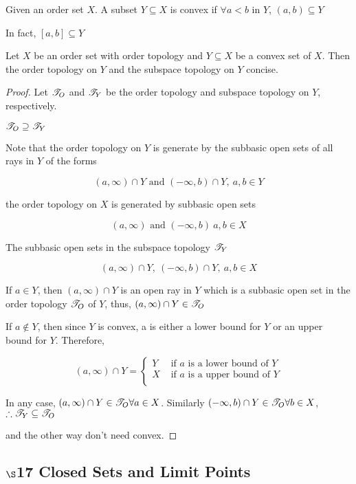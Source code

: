 \begin{defn}
	Given an order set $X$. A subset $Y \subseteq X$ is convex if $\forall a < b$ in $Y$, $(a,b) \subseteq Y$
	
	In fact, $[a,b] \subseteq Y$
\end{defn}

\begin{thm*}
	Let $X$ be an order set with order topology and $Y \subseteq X$ be a convex set of $X$. Then the order topology on $Y$ and the subspace topology on $Y$ concise.
\end{thm*}

\begin{proof}
	Let $\mathscr{T}_O$ and $\mathscr{T}_Y$ be the order topology and subspace topology on $Y$, respectively.
	
	$\mathscr{T}_O \supseteq \mathscr{T}_Y$
	
	Note that the order topology on $Y$ is generate by the subbasic open sets  of all rays in $Y$ of the forms
	
	$$(a,\infty)\cap Y \text{ and } (-\infty,b) \cap Y,~ a,b \in Y$$
	
	the order topology on $X$ is generated by subbasic open sets
	
	$$(a,\infty) \text{ and } (-\infty,b)~a,b \in X$$
	
	The subbasic open sets in the subspace topology $\mathscr{T}_Y$
	
	$$(a , \infty) \cap Y,~ ( -\infty , b) \cap Y,~ a,b \in X$$
	
	If $a \in Y$, then $(a , \infty) \cap Y$ is an open ray in $Y$ which is a subbasic open set in the order topology $\mathscr{T}_O$ of $Y$, thus, $(a,\infty) \cap Y \in \mathscr{T}_O$
	
	If $a \notin Y$, then since $Y$ is convex, a is either a lower bound for $Y$ or an upper bound for $Y$. Therefore,
	
	$$(a,\infty) \cap Y = \begin{cases}
		Y & \text{ if } a \text{ is a lower bound of } Y\\
		X & \text{ if } a \text{ is a upper bound of } Y\\
	\end{cases}$$
	
	In any case, $(a,\infty) \cap Y \in \mathscr{T}_O \forall a \in X$. Similarly $(-\infty , b) \cap Y \in \mathscr{T}_O \forall b \in X$, $\therefore \mathscr{T}_Y \subseteq \mathscr{T}_O$
	
	and the other way don't need convex.
\end{proof}

\subsection*{$\S$17 Closed Sets and Limit Points}

